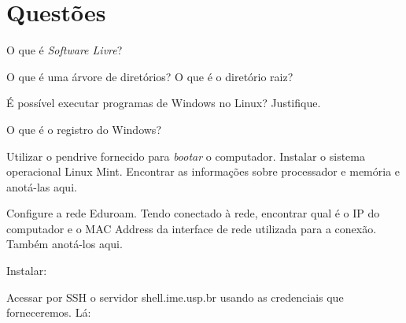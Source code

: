 


\siheader
\section*{Questões}
\begin{questions}

\question
O que é \textit{Software Livre}?
\vfill

\question
O que é uma árvore de diretórios? O que é o diretório raiz?
\vfill

\question
É possível executar programas de Windows no Linux? Justifique.
\vfill

\question
O que é o registro do Windows?
\vfill

\question
Utilizar o pendrive fornecido para \emph{bootar} o computador. Instalar o sistema operacional Linux Mint. Encontrar as informações sobre processador e memória e anotá-las aqui.
\vfill

\question
Configure a rede Eduroam. Tendo conectado à rede, encontrar qual é o IP do computador e o MAC Address da interface de rede utilizada para a conexão. Também anotá-los aqui.
\vfill

\question
Instalar:

\question
Acessar por SSH o servidor shell.ime.usp.br usando as credenciais que forneceremos. Lá:

\end{questions}

